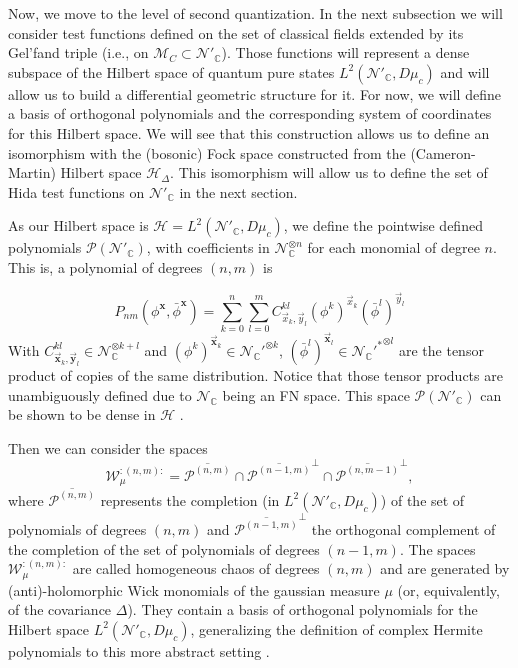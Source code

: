 \documentclass[12pt]{article}%
\begin{document}
Now, we move to the level of second quantization.  In the next subsection we will consider  test functions defined on the set of classical fields extended by its Gel'fand triple (i.e., on $\mathcal{M}_C \subset \mathcal{N}'_\mathbb{C}$).   Those functions will represent a dense subspace of the Hilbert space of quantum pure states $L^2(\mathcal{N}'_\mathbb{C}, D\mu_c)$ and will allow us to build a differential geometric structure for it.  For now, we will define a basis of orthogonal polynomials and the corresponding system of coordinates for this Hilbert space. We will see that this construction allows us to define an isomorphism with the (bosonic) Fock space constructed from the  (Cameron-Martin) Hilbert space $\mathcal{H}_\Delta$. This isomorphism will allow us to define the set of Hida test functions on $\mathcal{N}'_\mathbb{C}$ in the next section.

As our Hilbert space is $\mathcal{H}=L^2(\mathcal{N}'_\mathbb{C}, D\mu_c)$, we define the pointwise defined polynomials $\mathcal{P}(\mathcal{N}'_\mathbb{C})$, with coefficients in $\mathcal{N}_{\mathbb{C}}^{\otimes n}$ for each monomial of degree $n$. This is, a polynomial of degrees $(n,m)$ is  


\begin{equation}
    \label{eq:polynomialscompl} 
    P_{nm}(\phi^{\mathbf{x}},\bar\phi^{\mathbf{x}})= \sum_{k=0}^n\sum_{l=0}^m C^{kl}_{\vec{x}_k,\vec{y}_l}(\phi^k)^{\vec{x}_k}(\bar\phi^l)^{\vec{y}_l}
\end{equation}
With $C^{kl}_{\vec{\mathbf{x}}_k,\vec{\mathbf{y}}_l}\in \mathcal{N}_{\mathbb{C}}^{\otimes k+l}$ and $(\phi^k)^{\vec{\mathbf{x}}_k}\in {\mathcal{N}_\mathbb{C}'}^{\otimes k}$, $(\bar\phi^l)^{\vec{\mathbf{x}}_l}\in {\mathcal{{N}_\mathbb{C}'}^*}^{\otimes l}$ are the tensor product of copies of the same distribution. Notice that those tensor products are unambiguously defined due to $\mathcal{N}_{\mathbb{C}}$ being an FN space.  This space $\mathcal{P}(\mathcal{N}'_\mathbb{C})$ can be shown to be dense in $\mathcal{H}$ \cite{Hida1993}.

Then we can consider the spaces
\begin{equation}
\label{eq:wickspaces}
\mathcal{W}_\mu^{:(n,m):}=\overline{\mathcal{P}^{(n,m)}}\cap \overline{\mathcal{P}^{{(n-1,m)}}}^\perp\cap \overline{\mathcal{P}^{{(n,m-1)}}}^\perp,
\end{equation}
where $\overline{\mathcal{P}^{(n,m)}}$ represents the completion (in $L^2(\mathcal{N}'_\mathbb{C}, D\mu_c)$) of the set of polynomials of degrees $(n,m)$  and $\overline{\mathcal{P}^{(n-1,m)}}^\perp$ the orthogonal complement of the completion of the set of polynomials of degrees $(n-1,m)$. The spaces  $\mathcal{W}_\mu^{:(n,m):}$  are called homogeneous chaos of degrees $(n,m)$ and are generated by (anti)-holomorphic Wick monomials of the gaussian measure $\mu$ (or, equivalently, of the covariance $\Delta$). They contain a basis of orthogonal polynomials for the Hilbert space $L^2(\mathcal{N}'_\mathbb{C}, D\mu_c)$, generalizing the definition of complex Hermite polynomials to this more abstract setting \cite{Hida1980}.
\end{document}
